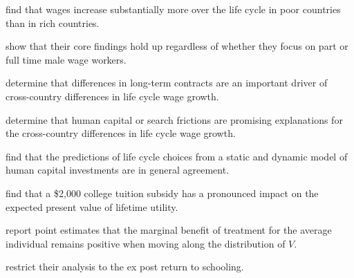 \begin{boenumerate}
\item \cite{Lagakos.2018} find that wages increase substantially more over the life cycle in poor countries than in rich countries.

\item \cite{Lagakos.2018} show that their core findings hold up regardless of whether they focus on part or full time male wage workers.

\item \cite{Lagakos.2018} determine that differences in long-term contracts are an important driver of cross-country differences in life cycle wage growth.

\item \cite{Lagakos.2018} determine that human capital or search frictions are promising explanations for the cross-country differences in life cycle wage growth.

\item \cite{Keane.1997} find that the predictions of life cycle choices from a static and dynamic model of human capital investments are in general agreement.

\item \cite{Keane.1997} find that a \$2,000 college tuition subsidy has a pronounced impact on the expected present value of lifetime utility.

\item \cite{Carneiro.2011} report point estimates that the marginal benefit of treatment for the average individual remains positive when moving along the distribution of $V$.

\item \cite{Heckman.2006a} restrict their analysis to the ex post return to schooling.
\end{boenumerate}
